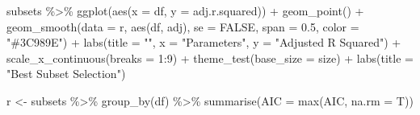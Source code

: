 \documentclass[
  english,
  man,floatsintext]{apa6}
\newenvironment{Shaded}{\begin{snugshade}}{\end{snugshade}}
\newcommand{\AttributeTok}[1]{\textcolor[rgb]{0.77,0.63,0.00}{#1}}
\newcommand{\ConstantTok}[1]{\textcolor[rgb]{0.00,0.00,0.00}{#1}}
\newcommand{\DecValTok}[1]{\textcolor[rgb]{0.00,0.00,0.81}{#1}}
\newcommand{\FloatTok}[1]{\textcolor[rgb]{0.00,0.00,0.81}{#1}}
\newcommand{\FunctionTok}[1]{\textcolor[rgb]{0.00,0.00,0.00}{#1}}
\newcommand{\NormalTok}[1]{#1}
\newcommand{\OtherTok}[1]{\textcolor[rgb]{0.56,0.35,0.01}{#1}}
\newcommand{\SpecialCharTok}[1]{\textcolor[rgb]{0.00,0.00,0.00}{#1}}
\newcommand{\StringTok}[1]{\textcolor[rgb]{0.31,0.60,0.02}{#1}}
\begin{document}
\begin{Shaded}
\begin{Highlighting}[]
\NormalTok{subsets }\SpecialCharTok{\%\textgreater{}\%} 
  \FunctionTok{ggplot}\NormalTok{(}\FunctionTok{aes}\NormalTok{(}\AttributeTok{x =}\NormalTok{ df, }\AttributeTok{y =}\NormalTok{ adj.r.squared)) }\SpecialCharTok{+} 
  \FunctionTok{geom\_point}\NormalTok{() }\SpecialCharTok{+} 
  \FunctionTok{geom\_smooth}\NormalTok{(}\AttributeTok{data =}\NormalTok{ r, }\FunctionTok{aes}\NormalTok{(df, adj), }
              \AttributeTok{se =} \ConstantTok{FALSE}\NormalTok{, }\AttributeTok{span =} \FloatTok{0.5}\NormalTok{, }\AttributeTok{color =} \StringTok{"\#3C989E"}\NormalTok{) }\SpecialCharTok{+} 
  \FunctionTok{labs}\NormalTok{(}\AttributeTok{title =} \StringTok{""}\NormalTok{, }\AttributeTok{x =} \StringTok{"Parameters"}\NormalTok{, }\AttributeTok{y =} \StringTok{"Adjusted R Squared"}\NormalTok{) }\SpecialCharTok{+} 
  \FunctionTok{scale\_x\_continuous}\NormalTok{(}\AttributeTok{breaks =} \DecValTok{1}\SpecialCharTok{:}\DecValTok{9}\NormalTok{) }\SpecialCharTok{+} 
  \FunctionTok{theme\_test}\NormalTok{(}\AttributeTok{base\_size =}\NormalTok{ size) }\SpecialCharTok{+} \FunctionTok{labs}\NormalTok{(}\AttributeTok{title =} \StringTok{"Best Subset Selection"}\NormalTok{)}

\NormalTok{r }\OtherTok{\textless{}{-}}\NormalTok{ subsets }\SpecialCharTok{\%\textgreater{}\%} 
  \FunctionTok{group\_by}\NormalTok{(df) }\SpecialCharTok{\%\textgreater{}\%} 
  \FunctionTok{summarise}\NormalTok{(}\AttributeTok{AIC =} \FunctionTok{max}\NormalTok{(AIC, }\AttributeTok{na.rm =}\NormalTok{ T))}


\end{Highlighting}
\end{Shaded}
\end{document}
